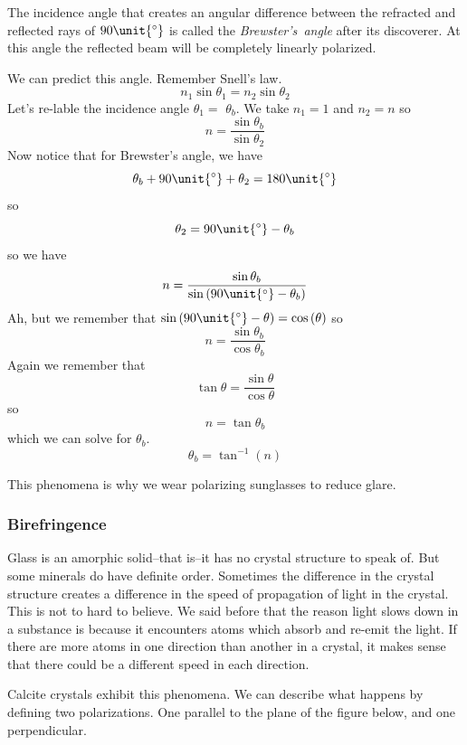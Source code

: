 \documentclass{article}
\begin{document}
The incidence angle that creates an angular difference between the refracted
and reflected rays of $90\unit{%
{{}^\circ}%
}$ is called the \emph{Brewster's\ angle} after its discoverer. At this
angle the reflected beam will be completely linearly polarized.

We can predict this angle. Remember Snell's law.%
\[
n_{1}\sin \theta _{1}=n_{2}\sin \theta _{2}
\]%
Let's re-lable the incidence angle $\theta _{1}=$ $\theta _{b}.$ We take $%
n_{1}=1$ and $n_{2}=n$ so%
\[
n=\frac{\sin \theta _{b}}{\sin \theta _{2}}
\]%
Now notice that for Brewster's angle, we have 
\[
\theta _{b}+90\unit{%
{{}^\circ}%
}+\theta _{2}=180\unit{%
{{}^\circ}%
}
\]%
so%
\[
\theta _{2}=90\unit{%
{{}^\circ}%
}-\theta _{b}
\]%
so we have%
\[
n=\frac{\sin \theta _{b}}{\sin \left( 90\unit{%
{{}^\circ}%
}-\theta _{b}\right) }
\]%
Ah, but we remember that $\sin \left( 90\unit{%
{{}^\circ}%
}-\theta \right) =\cos \left( \theta \right) $ so%
\[
n=\frac{\sin \theta _{b}}{\cos \theta _{b}}
\]%
Again we remember that 
\[
\tan \theta =\frac{\sin \theta }{\cos \theta }
\]%
so%
\begin{equation}
n=\tan \theta _{b}
\end{equation}%
which we can solve for $\theta _{b}.$%
\[
\theta _{b}=\tan ^{-1}\left( n\right)
\]

This phenomena is why we wear polarizing sunglasses to reduce glare.

\subsubsection{Birefringence}

Glass is an amorphic solid--that is--it has no crystal structure to speak
of. But some minerals do have definite order. Sometimes the difference in
the crystal structure creates a difference in the speed of propagation of
light in the crystal. This is not to hard to believe. We said before that
the reason light slows down in a substance is because it encounters atoms
which absorb and re-emit the light. If there are more atoms in one direction
than another in a crystal, it makes sense that there could be a different
speed in each direction.

Calcite crystals exhibit this phenomena. We can describe what happens by
defining two polarizations. One parallel to the plane of the figure below,
and one perpendicular.
\end{document}
